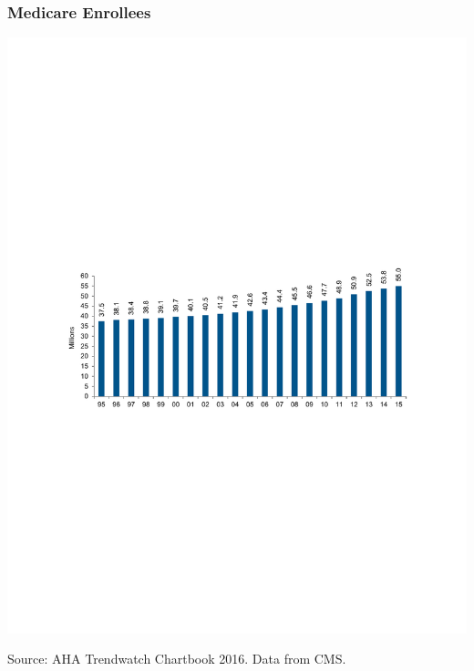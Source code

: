 \documentclass[ucs,9pt]{beamer}
\begin{document}
\begin{frame}
\frametitle{Medicare Enrollees}
\begin{center}
\includegraphics[scale=0.7]{1_17}
\end{center}
\tiny Source: AHA Trendwatch Chartbook 2016.  Data from CMS.
\end{frame}
\end{document}
